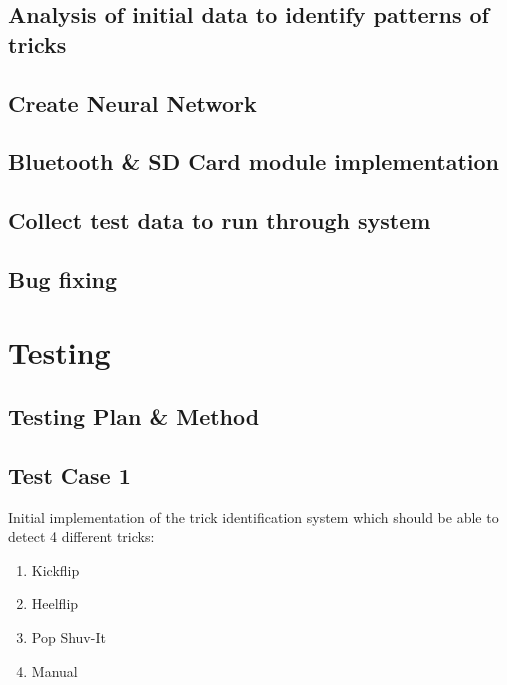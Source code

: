 \subsection{Analysis of initial data to identify patterns of tricks}\label{initialdatacapture}

\subsection{Create Neural Network}\label{createneuralnet}

\subsection{Bluetooth \& SD Card module implementation}\label{bluetoothsdcard}

\subsection{Collect test data to run through system}\label{collecttestdata}

\subsection{Bug fixing}\label{bugfixing}

\section{Testing}\label{testing}

\subsection{Testing Plan \& Method}\label{testplanmethod}

\subsection{Test Case 1}\label{testcase1}

Initial implementation of the trick identification system which should be able to detect 4 different tricks:

\begin{enumerate}
\item Kickflip
\item Heelflip
\item Pop Shuv-It
\item Manual
\end{enumerate}

